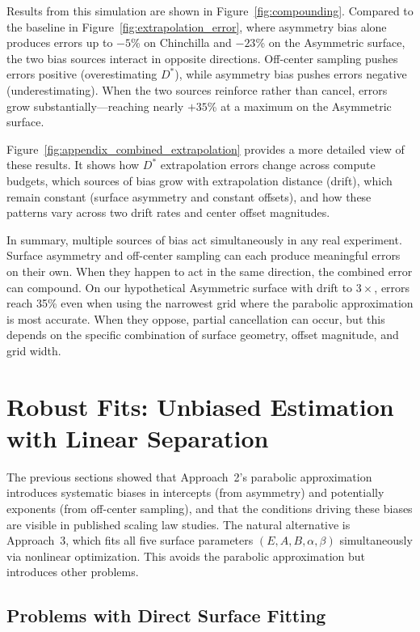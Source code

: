 \documentclass[11pt]{article}
\begin{document}
Results from this simulation are shown in Figure~\ref{fig:compounding}.
Compared to the baseline in Figure~\ref{fig:extrapolation_error}, where
asymmetry bias alone produces errors up to $-5$\% on Chinchilla and $-23$\% on
the Asymmetric surface, the two bias sources interact in opposite directions.
Off-center sampling pushes errors positive (overestimating $D^*$), while
asymmetry bias pushes errors negative (underestimating). When the two sources
reinforce rather than cancel, errors grow substantially---reaching nearly $+35$\% at a
maximum on the Asymmetric surface.

Figure~\ref{fig:appendix_combined_extrapolation} provides a
more detailed view of these results. It shows how $D^*$ extrapolation errors
change across compute budgets, which sources of bias grow with extrapolation
distance (drift), which remain constant (surface asymmetry and constant
offsets), and how these patterns vary across two drift rates and center offset
magnitudes.

In summary, multiple sources of bias act simultaneously in any real experiment.
Surface asymmetry and off-center sampling can each produce meaningful errors on
their own. When they happen to act in the same direction, the combined error can
compound. On our hypothetical Asymmetric surface with drift to $3\times$,
errors reach 35\% even when using the narrowest grid where the parabolic
approximation is most accurate. When they oppose, partial cancellation can
occur, but this depends on the specific combination of surface geometry, offset
magnitude, and grid width.

\section{Robust Fits: Unbiased Estimation with Linear Separation}
\label{sec:vpnls}

The previous sections showed that Approach~2's parabolic approximation
introduces systematic biases in intercepts (from asymmetry) and potentially
exponents (from off-center sampling), and that the conditions driving these
biases are visible in published scaling law studies. The natural alternative is
Approach~3, which fits all five surface parameters $(E, A, B, \alpha, \beta)$
simultaneously via nonlinear optimization. This avoids the parabolic
approximation but introduces other problems.

\subsection{Problems with Direct Surface Fitting}
\label{sec:approach3_problems}
\end{document}
